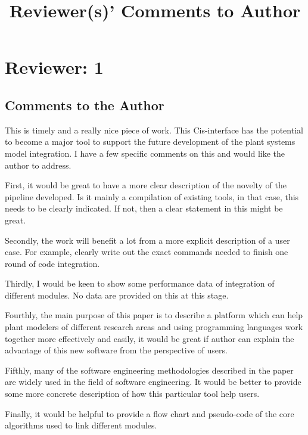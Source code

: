 \documentclass[11pt]{article}
\title{Reviewer(s)' Comments to Author}
\newcommand{\cmark}{\ding{51}}%
\newcommand{\done}{\rlap{$\square$}{\raisebox{2pt}{\large\hspace{1pt}\cmark}}%
\hspace{-2.5pt}}
\begin{document}
\maketitle



\section{Reviewer: 1}

\subsection{Comments to the Author}

This is timely and a really nice piece of work. This Cis-interface has the potential to become a major tool to support the future development of the plant systems model integration. I have a few specific comments on this and would like the author to address. 
\begin{todolist}
\item First, it would be great to have a more clear description of the novelty of the pipeline developed. Is it mainly a compilation of existing tools, in that case, this needs to be clearly indicated. If not, then a clear statement in this might be great. 
\item[\done] Secondly, the work will benefit a lot from a more explicit description of a user case. For example, clearly write out the exact commands needed to finish one round of code integration. 
\item[\done] Thirdly, I would be keen to show some performance data of integration of different modules. No data are provided on this at this stage. 
\item Fourthly, the main purpose of this paper is to describe a platform which can help plant modelers of different research areas and using programming languages work together more effectively and easily, it would be great if author can explain the advantage of this new software from the perspective of users. 
\item Fifthly,  many of the software engineering methodologies described in the paper are widely used in the field of software engineering. It would be better to provide some more concrete description of how this particular tool help users.  
\item Finally, it would be helpful to provide a flow chart and pseudo-code of the core algorithms used to link different modules.
\end{todolist}
\end{document}
